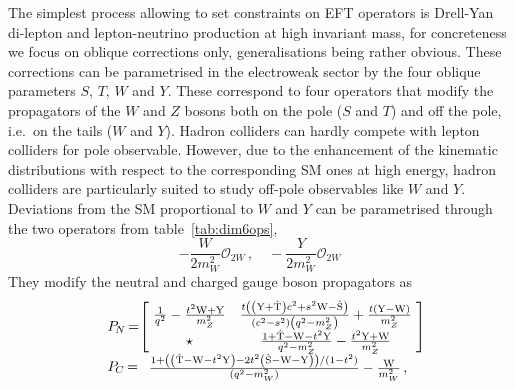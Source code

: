 The simplest process allowing to set constraints on EFT operators is Drell-Yan di-lepton and lepton-neutrino production at high invariant mass, for concreteness we focus on oblique corrections only, generalisations being rather obvious. These corrections can be parametrised in the electroweak sector by the four oblique parameters $S$, $T$, $W$ and $Y$. These correspond to four operators that modify the propagators of the $W$ and $Z$ bosons both on the pole ($S$ and $T$) and off the pole, i.e.~on the tails ($W$ and $Y$). Hadron colliders can hardly compete with lepton colliders for pole observable. However, due to the enhancement of the kinematic distributions with respect to the corresponding SM ones at high energy, hadron colliders are particularly suited to study off-pole observables like $W$ and $Y$. Deviations from the SM proportional to $W$ and $Y$ can be parametrised through the two operators from table~\ref{tab:dim6ops},
\begin{equation}
 -\frac{W}{2m_W^2}\mathcal{O}_{2W}   \,, \quad  -\frac{Y}{2m_W^2}\mathcal{O}_{2W}   
 \end{equation}
They modify the neutral and charged gauge boson propagators as
\begin{equation}\label{eq:propagators}
\begin{array}{ll}
& P_{\hspace{-1pt}{N}}\hspace{-1pt} = \hspace{-2.5pt}\left[\hspace{-2pt}
\begin{array}{cc}
 \frac{1}{q^2}-\frac{t^{2}{\rm{\sc{W}}}+{\rm{\sc{Y}}}}{m_Z^2} & \frac{t \left(\left({\rm{\sc{Y}}}+{\rm\hat{T}}\right) c^2+s^2 {\rm{\sc{W}}}-{\rm\hat{S}}\right)}{\left(c^2-s^2\right) \left(q^2-m_Z^2\right)}+\frac{t ({\rm{\sc{Y}}}-{\rm{\sc{W}}})}{m_Z^2} \\
 \star & \frac{1+ {\rm\hat{T}}-{\rm{\sc{W}}}-t^{2}{\rm{\sc{Y}}}}{q^2-m_Z^2}-\frac{t^{2}{\rm{\sc{Y}}}+{\rm{\sc{W}}}}{m_Z^2} \\
\end{array}
\hspace{-2pt}
\right] \\
& P_{\hspace{-1pt}{C}}\hspace{-1pt} =
\begin{array}{c}
\frac{1+\left( \left({\rm\hat{T}}-{\rm{\sc{W}}}-t^2 {\rm{\sc{Y}}}\right)-2 t^2 \left({\rm\hat{S}}-{\rm{\sc{W}}}-{\rm{\sc{Y}}}\right)\right)/(1-t^2)}{(q^{2}-m_W^2)}-\frac{{\rm{\sc{W}}}}{m_W^2}\,,
\end{array}
\end{array}
\end{equation}
